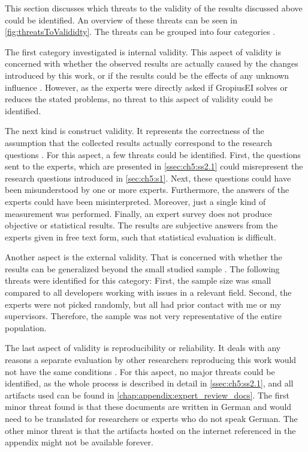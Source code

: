 This section discusses which threats to the validity of the results discussed above could be identified.
An overview of these threats can be seen in \cref{fig:threatsToValididty}.
The threats can be grouped into four categories \cite{runeson2009guidelines}.

The first category investigated is internal validity.
This aspect of validity is concerned with whether the observed results are actually caused by the changes introduced by this work,
or if the results could be the effects of any unknown influence \cite{runeson2009guidelines}.
However, as the experts were directly asked if \gls{GropiusEI} solves or reduces the stated problems, no threat to this aspect of validity could be identified.

The next kind is construct validity.
It represents the correctness of the assumption that the collected results actually correspond to the research questions \cite{runeson2009guidelines}.
For this aspect, a few threats could be identified.
First, the questions sent to the experts, which are presented in \cref{ssec:ch5:ss2.1} could misrepresent the research questions 
introduced in \cref{sec:ch5:s1}.
Next, these questions could have been misunderstood by one or more experts.
Furthermore, the answers of the experts could have been misinterpreted.
Moreover, just a single kind of measurement was performed.
Finally, an expert survey does not produce objective or statistical results.
The results are subjective answers from the experts given in free text form, such that statistical evaluation is difficult. 

Another aspect is the external validity.
That is concerned with whether the results can be generalized beyond the small studied sample \cite{runeson2009guidelines}.
The following threats were identified for this category:
First, the sample size was small compared to all developers working with issues in a relevant field.
Second, the experts were not picked randomly, but all had prior contact with me or my supervisors.
Therefore, the sample was not very representative of the entire population.

The last aspect of validity is reproducibility or reliability.
It deals with any reasons a separate evaluation by other researchers reproducing this work would not have the same conditions \cite{runeson2009guidelines}.
For this aspect, no major threats could be identified, as the whole process is described in detail in \cref{ssec:ch5:ss2.1}, and all artifacts used can be found in \cref{chap:appendix:expert_review_docs}.
The first minor threat found is that these documents are written in German and would need to be translated for researchers or experts who do not speak German.
The other minor threat is that the artifacts hosted on the internet referenced in the appendix might not be available forever.